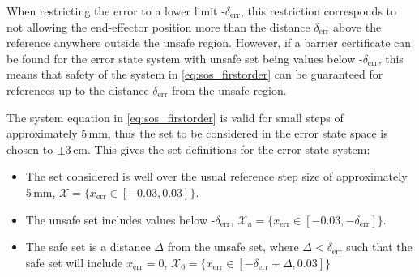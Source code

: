 When restricting the error to a lower limit -$\delta_\text{err}$, this restriction corresponds to not allowing the end-effector position more than the distance $\delta_\text{err}$ above the reference anywhere outside the unsafe region. However, if a barrier certificate can be found for the error state system with unsafe set being values below -$\delta_\text{err}$, this means that safety of the system in \autoref{eq:sos_firstorder} can be guaranteed for references up to  the distance $\delta_\text{err}$ from the unsafe region.



The system equation in \autoref{eq:sos_firstorder} is valid for small steps of approximately 5\,mm, thus the set to be considered in the error state space is chosen to $\pm 3$\,cm. This gives the set definitions for the error state system:
\vspace{-3mm}
\begin{itemize}
\itemsep-0.7mm
\item The set considered is well over the usual reference step size of approximately 5\,mm, $\mathcal{X}=\{x_\text{err}\in[-0.03,0.03] \}$.
\item The unsafe set includes values below -$\delta_\text{err}$, $\mathcal{X}_u=\{x_\text{err}\in [-0.03,-\delta_\text{err}] \}$.
\item The safe set is a distance $\Delta$ from the unsafe set, where $\Delta<\delta_\text{err}$ such that the safe set will include $x_\text{err}=0$, $\mathcal{X}_0=\{x_\text{err}\in [-\delta_\text{err}+\Delta,0.03] \}$
\end{itemize}

